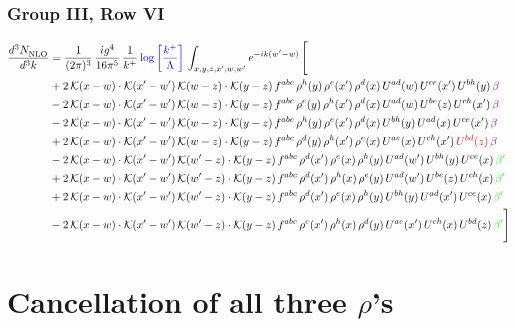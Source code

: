 \documentclass[9pt]{article}
\numberwithin{equation}{section}
\begin{document}
\subsubsection{Group III, Row VI}
\begin{align}
     \frac{d^{3}N_{\rm NLO}^{\rm}}{d^{3}k}  & = \frac{1}{(2\pi)^{3}}\, \frac{ig^{4}}{16\pi^{5}}\, \frac{1}{k^{+}}\, {\color{blue}\log{\left[\frac{k^{+}}{\Lambda}\right]}}\,\int_{x,y,z,x^{\prime},w,w^{\prime}}e^{-ik(w^{\prime}-w)}\, \Bigg[\notag \\ & +2\,\mathcal{K}(x-w)\cdot\mathcal{K}(x'-w')\,\mathcal{K}(w-z)\cdot\mathcal{K}(y-z)\, f^{abc}\,\rho^{h}(y)\,\rho^{e}(x')\,\rho^{d}(x)\,U^{ad}(w)\,U^{ce}(x')\,U^{bh}(y)\,{\color{violet} \beta}\notag\\ &-2\,\mathcal{K}(x-w)\cdot\mathcal{K}(x'-w')\,\mathcal{K}(w-z)\cdot\mathcal{K}(y-z)\, f^{abc}\,\rho^{e}(y)\,\rho^{h}(x')\,\rho^{d}(x)\,U^{ad}(w)\,U^{be}(z)\,U^{ch}(x')\,{\color{violet} \beta}\notag \\ &-2\,\mathcal{K}(x-w)\cdot\mathcal{K}(x'-w')\,\mathcal{K}(w-z)\cdot\mathcal{K}(y-z)\, f^{abc}\,\rho^{h}(y)\,\rho^{e}(x')\,\rho^{d}(x)\,U^{bh}(y)\,U^{ad}(x)\,U^{ce}(x')\,{\color{violet} \beta}\notag\\ & +2\,\mathcal{K}(x-w)\cdot\mathcal{K}(x'-w')\,\mathcal{K}(w-z)\cdot\mathcal{K}(y-z)\, f^{abc}\,\rho^{d}(y)\,\rho^{h}(x')\,\rho^{e}(x)\,U^{ae}(x)\,U^{ch}(x')\,{\color{red}U^{bd}(z)}\,{\color{violet} \beta}\notag\\ & -2\, \mathcal{K}(x-w) \cdot \mathcal{K}(x'-w')\, \mathcal{K}(w'-z) \cdot \mathcal{K}(y-z)\, f^{abc}\, \rho^{d}(x')\,\rho^{e}(x)\, \rho^{h}(y)\,U^{ad}(w')\,U^{bh}(y)\,U^{ce}(x)\, {\color{green} \beta'}\notag \\ & + 2\, \mathcal{K}(x-w) \cdot \mathcal{K}(x'-w')\, \mathcal{K}(w'-z) \cdot \mathcal{K}(y-z)\, f^{abc}\, \rho^{d}(x')\,\rho^{h}(x)\, \rho^{e}(y)\,U^{ad}(w')\,U^{be}(z)\,U^{ch}(x)\, {\color{green} \beta'}\notag \\ & +2\, \mathcal{K}(x-w) \cdot \mathcal{K}(x'-w')\, \mathcal{K}(w'-z) \cdot \mathcal{K}(y-z)\, f^{abc}\, \rho^{d}(x')\,\rho^{e}(x)\, \rho^{h}(y)\,U^{bh}(y)\,U^{ad}(x')\,U^{ce}(x)\, {\color{green} \beta'}\notag \\ & -2\, \mathcal{K}(x-w) \cdot \mathcal{K}(x'-w')\, \mathcal{K}(w'-z) \cdot \mathcal{K}(y-z)\, f^{abc}\, \rho^{e}(x')\,\rho^{h}(x)\, \rho^{d}(y)\,U^{ae}(x')\,U^{ch}(x)\,U^{bd}(z)\, {\color{green} \beta'}\Bigg]
\end{align}  
\section{Cancellation of all three $\rho$'s}
\end{document}
